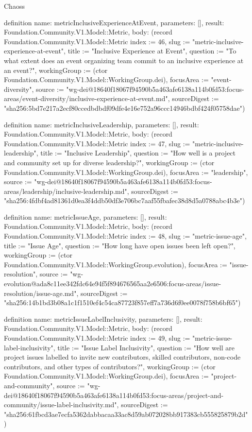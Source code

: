 \begin{lexlean}{Chaoss}
\begin{semanticmodule}
definition{
  name: metricInclusiveExperienceAtEvent,
  parameters: [],
  result: Foundation.Community.V1.Model::Metric,
  body: (record Foundation.Community.V1.Model::Metric {index := 46, slug := "metric-inclusive-experience-at-event", title := "Inclusive Experience at Event", question := "To what extent does an event organizing team commit to an inclusive experience at an event?", workingGroup := (ctor Foundation.Community.V1.Model::WorkingGroup.dei), focusArea := "event-diversity", source := "wg-dei@18640f18067f94590b5a463afe6138a114b0fd53:focus-areas/event-diversity/inclusive-experience-at-event.md", sourceDigest := "sha256:5bd7e217a2ecf80ccedbdbdf09dfe4e16e752a96ccc14946bdbf424f05758dae"})
}

definition{
  name: metricInclusiveLeadership,
  parameters: [],
  result: Foundation.Community.V1.Model::Metric,
  body: (record Foundation.Community.V1.Model::Metric {index := 47, slug := "metric-inclusive-leadership", title := "Inclusive Leadership", question := "How well is a project and community set up for diverse leadership?", workingGroup := (ctor Foundation.Community.V1.Model::WorkingGroup.dei), focusArea := "leadership", source := "wg-dei@18640f18067f94590b5a463afe6138a114b0fd53:focus-areas/leadership/inclusive-leadership.md", sourceDigest := "sha256:4fdbf4ad81361d0ea3f4ddb50df3e706bc7aaf55fbafec38d8d5a0788abc4b3e"})
}

definition{
  name: metricIssueAge,
  parameters: [],
  result: Foundation.Community.V1.Model::Metric,
  body: (record Foundation.Community.V1.Model::Metric {index := 48, slug := "metric-issue-age", title := "Issue Age", question := "How long have open issues been left open?", workingGroup := (ctor Foundation.Community.V1.Model::WorkingGroup.evolution), focusArea := "issue-resolution", source := "wg-evolution@ada8c11ee342fdc64e94f5f894676565aa2e6506:focus-areas/issue-resolution/issue-age.md", sourceDigest := "sha256:14b1bd3b08a1c1f1510ef4c54ca87723f857eff7a736d6f0ee0078f758b6bf65"})
}

definition{
  name: metricIssueLabelInclusivity,
  parameters: [],
  result: Foundation.Community.V1.Model::Metric,
  body: (record Foundation.Community.V1.Model::Metric {index := 49, slug := "metric-issue-label-inclusivity", title := "Issue Label Inclusivity", question := "How well are project issues labelled to invite new contributors, skilled contributors, non-code contributors, and other types of contributors?", workingGroup := (ctor Foundation.Community.V1.Model::WorkingGroup.dei), focusArea := "project-and-community", source := "wg-dei@18640f18067f94590b5a463afe6138a114b0fd53:focus-areas/project-and-community/issue-label-inclusivity.md", sourceDigest := "sha256:61fbcd3ae7ecfa5362dabbacaa33ac8d59ab072028bb917383cb555825879b2d"})
}


\end{semanticmodule}
\end{lexlean}
